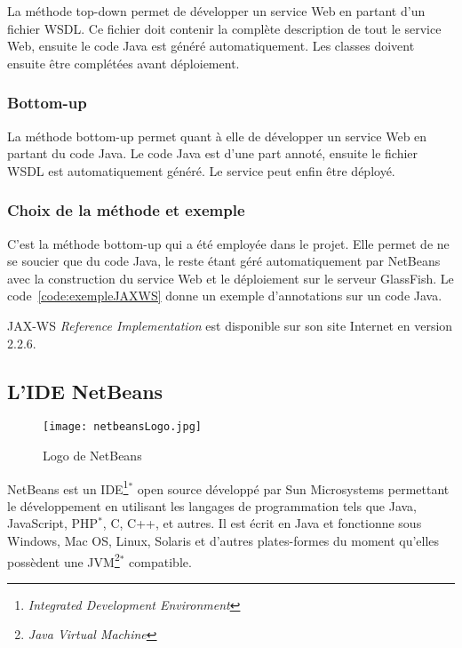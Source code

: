 La m\'ethode top-down permet de d\'evelopper un service Web en partant d'un fichier WSDL.
Ce fichier doit contenir la compl\`ete description de tout le service Web, ensuite le code Java est g\'en\'er\'e automatiquement.
Les classes doivent ensuite \^etre compl\'et\'ees avant d\'eploiement.

\subsubsection{Bottom-up}

La m\'ethode bottom-up permet quant \`a elle de d\'evelopper un service Web en partant du code Java.
Le code Java est d'une part annot\'e, ensuite le fichier WSDL est automatiquement g\'en\'er\'e.
Le service peut enfin \^etre d\'eploy\'e.

\subsubsection{Choix de la m\'ethode et exemple}

C'est la m\'ethode bottom-up qui a \'et\'e employ\'ee dans le projet.
Elle permet de ne se soucier que du code Java, le reste \'etant g\'er\'e automatiquement par NetBeans avec la construction du service Web et le d\'eploiement sur le serveur GlassFish.
Le code~\ref{code:exempleJAXWS} donne un exemple d'annotations sur un code Java.

\vspace{0.20cm}


\label{code:exempleJAXWS}

\vspace{0.20cm}

JAX-WS \textit{Reference Implementation} est disponible sur son site Internet\cite{biblio:siteJAXWS} en version 2.2.6.

\subsection{L'IDE NetBeans}

\begin{figure}[!ht]
	\centering
	\texttt{[image: netbeansLogo.jpg]}
	\caption{Logo de NetBeans}

\end{figure}

NetBeans est un IDE\protect\footnote{\textit{Integrated Development Environment}}$^*$ open source d\'evelopp\'e par Sun Microsystems permettant le d\'eveloppement en utilisant les langages de programmation tels que Java, JavaScript, PHP$^*$, C, C++, et autres.
Il est \'ecrit en Java et fonctionne sous Windows, Mac OS, Linux, Solaris et d'autres plates-formes du moment qu'elles poss\`edent une JVM\protect\footnote{\textit{Java Virtual Machine}}$^*$ compatible.

